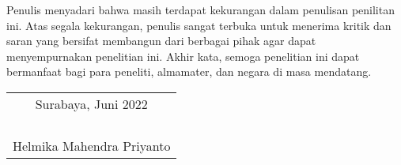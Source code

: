 \par Penulis menyadari bahwa masih terdapat kekurangan dalam penulisan penilitan ini. Atas segala kekurangan, penulis sangat
terbuka untuk menerima kritik dan saran yang bersifat membangun dari berbagai pihak agar dapat menyempurnakan penelitian ini. 
Akhir kata, semoga penelitian ini dapat bermanfaat bagi para peneliti, almamater, dan negara di masa mendatang.

\begin{flushright}
  \begin{tabular}[b]{c}
    Surabaya, Juni 2022\\
    \\
    \\
    \\
    \\
    Helmika Mahendra Priyanto
  \end{tabular}
\end{flushright}
